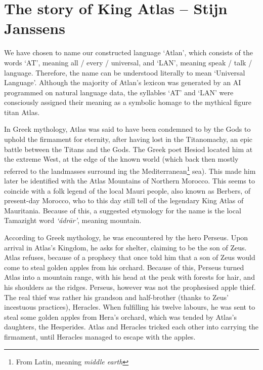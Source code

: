 \section{The story of King Atlas -- {\small Stijn Janssens}}

We have chosen to name our constructed language ‘Atlan’, which consists of the words ‘AT’, meaning all / every / universal, and ‘LAN’, meaning speak / talk / language. Therefore, the name can be understood literally to mean ‘Universal Language’. Although the majority of Atlan’s lexicon was generated by an AI programmed on natural language data, the syllables ‘AT’ and ‘LAN’ were consciously assigned their meaning as a symbolic homage to the mythical figure titan Atlas.  

In Greek mythology, Atlas was said to have been condemned to by the Gods to uphold the firmament for eternity, after having lost in the Titanomachy, an epic battle between the Titans and the Gods. The Greek poet Hesiod located him at the extreme West, at the edge of the known world (which back then mostly referred to the landmasses surround ing the Mediterranean\footnote{From Latin, meaning \textit{middle earth}} sea). This made him later be identified with the Atlas Mountains of Northern Morocco. This seems to coincide with a folk legend of the local Mauri people, also known as Berbers, of present-day Morocco, who to this day still tell of the legendary King Atlas of Mauritania.  Because of this, a suggested etymology for the name is the local Tamazight word \textit{‘ádrār’}, meaning mountain.  

According to Greek mythology, he was encountered by the hero Perseus. Upon arrival in Atlas’s Kingdom, he asks for shelter, claiming to be the son of Zeus. Atlas refuses, because of a prophecy that once told him that a son of Zeus would come to steal golden apples from his orchard. Because of this, Perseus turned Atlas into a mountain range, with his head at the peak with forests for hair, and his shoulders as the ridges. Perseus, however was not the prophesised apple thief. The real thief was rather his grandson and half-brother (thanks to Zeus’ incestuous practices), Heracles. When fulfilling his twelve labours, he was sent to steal some golden apples from Hera’s orchard, which was tended by Atlas’s daughters, the Hesperides. Atlas and Heracles tricked each other into carrying the firmament, until Heracles managed to escape with the apples.

